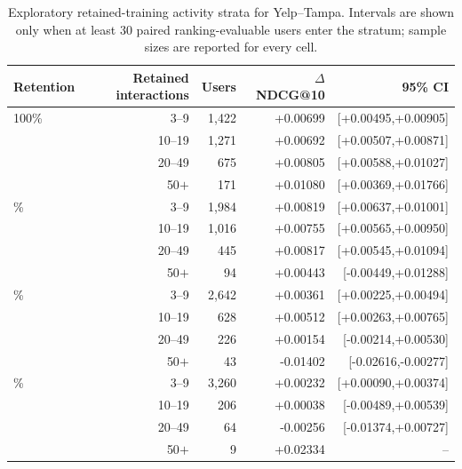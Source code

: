 \begin{table}[H]
\centering
\caption{Exploratory retained-training activity strata for Yelp--Tampa. Intervals are shown only when at least 30 paired ranking-evaluable users enter the stratum; sample sizes are reported for every cell.}
\label{tab:supp-activity-yelp-tampa-restaurants}
\small
\begin{tabular}{@{}lrrrr@{}}
\toprule
Retention & Retained interactions & Users & $\Delta$ NDCG@10 & 95\% CI \\
\midrule
100\% & 3--9 & 1,422 & +0.00699 & [+0.00495,+0.00905] \\
 & 10--19 & 1,271 & +0.00692 & [+0.00507,+0.00871] \\
 & 20--49 & 675 & +0.00805 & [+0.00588,+0.01027] \\
 & 50$+$ & 171 & +0.01080 & [+0.00369,+0.01766] \\
\addlinespace
75\% & 3--9 & 1,984 & +0.00819 & [+0.00637,+0.01001] \\
 & 10--19 & 1,016 & +0.00755 & [+0.00565,+0.00950] \\
 & 20--49 & 445 & +0.00817 & [+0.00545,+0.01094] \\
 & 50$+$ & 94 & +0.00443 & [-0.00449,+0.01288] \\
\addlinespace
50\% & 3--9 & 2,642 & +0.00361 & [+0.00225,+0.00494] \\
 & 10--19 & 628 & +0.00512 & [+0.00263,+0.00765] \\
 & 20--49 & 226 & +0.00154 & [-0.00214,+0.00530] \\
 & 50$+$ & 43 & -0.01402 & [-0.02616,-0.00277] \\
\addlinespace
25\% & 3--9 & 3,260 & +0.00232 & [+0.00090,+0.00374] \\
 & 10--19 & 206 & +0.00038 & [-0.00489,+0.00539] \\
 & 20--49 & 64 & -0.00256 & [-0.01374,+0.00727] \\
 & 50$+$ & 9 & +0.02334 & -- \\
\bottomrule
\end{tabular}
\end{table}
